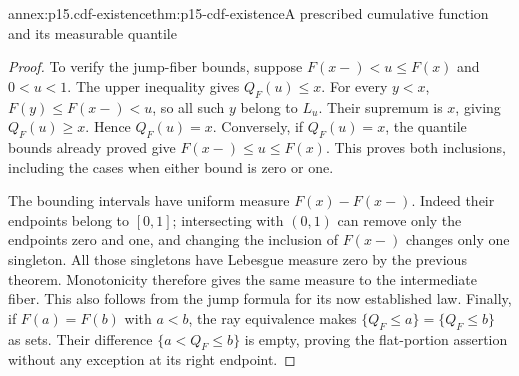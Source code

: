 \begin{annexitem}{annex:p15.cdf-existence}{thm:p15-cdf-existence}{A prescribed cumulative function and its measurable quantile}
\begin{proof}
To verify the jump-fiber bounds, suppose
\(F(x-)<u\leq F(x)\) and \(0<u<1\). The upper inequality
gives \(Q_F(u)\leq x\). For every \(y<x\),
\(F(y)\leq F(x-)<u\), so all such \(y\) belong to \(L_u\).
Their supremum is \(x\), giving \(Q_F(u)\geq x\). Hence
\(Q_F(u)=x\). Conversely, if \(Q_F(u)=x\), the quantile bounds
already proved give \(F(x-)\leq u\leq F(x)\). This proves both
inclusions, including the cases when either bound is zero or one.

The bounding intervals have uniform measure \(F(x)-F(x-)\).
Indeed their endpoints belong to \([0,1]\); intersecting with
\((0,1)\) can remove only the endpoints zero and one, and changing
the inclusion of \(F(x-)\) changes only one singleton. All those
singletons have Lebesgue measure zero by the previous theorem.
Monotonicity therefore gives the same measure to the intermediate
fiber. This also follows from the jump formula for its now established
law. Finally, if \(F(a)=F(b)\) with \(a<b\), the ray equivalence
makes \(\{Q_F\leq a\}=\{Q_F\leq b\}\) as sets. Their
difference \(\{a<Q_F\leq b\}\) is empty, proving the flat-portion
assertion without any exception at its right endpoint.
\end{proof}
\end{annexitem}
